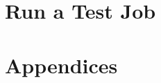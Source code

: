 \documentclass[letterpaper]{article}
\begin{document}
\section{Run a Test Job} \label{sec:test_job}


\clearpage
\appendix
\section*{Appendices}
\renewcommand{\thesubsection}{\Alph{subsection}}




\end{document}
